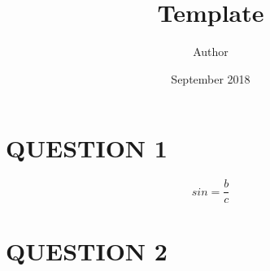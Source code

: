\documentclass{article}
\title{Template}
\author{Author }
\date{September 2018}
\begin{document}
    
    \maketitle
    
    \section{QUESTION 1}
    
    $$ sin = \frac{b}{c} $$
    
    \section{QUESTION 2}
    

    
\end{document}
